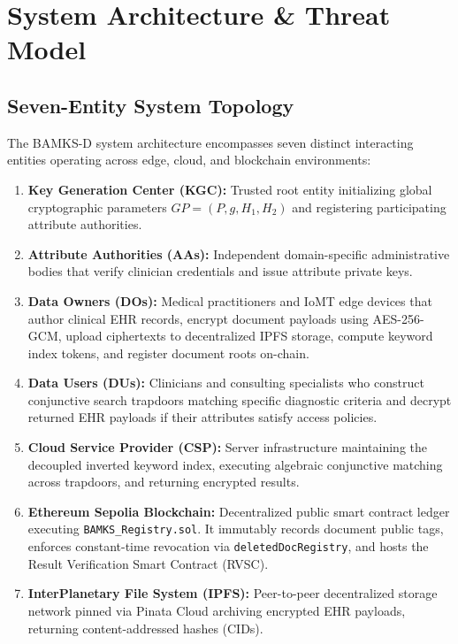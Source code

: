 \documentclass[journal,10pt,twocolumn]{IEEEtran}
\begin{document}
\section{System Architecture \& Threat Model}

\subsection{Seven-Entity System Topology}
The BAMKS-D system architecture encompasses seven distinct interacting entities operating across edge, cloud, and blockchain environments:
\begin{enumerate}
    \item \textbf{Key Generation Center (KGC):} Trusted root entity initializing global cryptographic parameters $GP = (P, g, H_1, H_2)$ and registering participating attribute authorities.
    \item \textbf{Attribute Authorities (AAs):} Independent domain-specific administrative bodies that verify clinician credentials and issue attribute private keys.
    \item \textbf{Data Owners (DOs):} Medical practitioners and IoMT edge devices that author clinical EHR records, encrypt document payloads using AES-256-GCM, upload ciphertexts to decentralized IPFS storage, compute keyword index tokens, and register document roots on-chain.
    \item \textbf{Data Users (DUs):} Clinicians and consulting specialists who construct conjunctive search trapdoors matching specific diagnostic criteria and decrypt returned EHR payloads if their attributes satisfy access policies.
    \item \textbf{Cloud Service Provider (CSP):} Server infrastructure maintaining the decoupled inverted keyword index, executing algebraic conjunctive matching across trapdoors, and returning encrypted results.
    \item \textbf{Ethereum Sepolia Blockchain:} Decentralized public smart contract ledger executing \texttt{BAMKS\_Registry.sol}. It immutably records document public tags, enforces constant-time revocation via \texttt{deletedDocRegistry}, and hosts the Result Verification Smart Contract (RVSC).
    \item \textbf{InterPlanetary File System (IPFS):} Peer-to-peer decentralized storage network pinned via Pinata Cloud archiving encrypted EHR payloads, returning content-addressed hashes (CIDs).
\end{enumerate}
\end{document}
